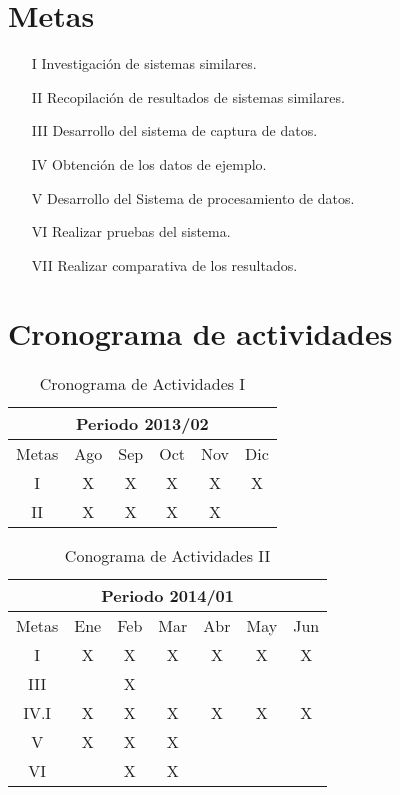 \section*{Metas}
\begin{itemize}
  \item[I] Investigación de sistemas similares.
  \item[II] Recopilación de resultados de sistemas similares.
  \item[III] Desarrollo del sistema  de captura de datos.
  \item[IV] Obtención de los datos de ejemplo.
  \item[V] Desarrollo del Sistema de procesamiento de datos.
  \item[VI] Realizar pruebas del sistema.
  \item[VII] Realizar comparativa de los resultados.
\end{itemize}





\section{Cronograma de actividades}



\begin{table}[h]
\centering
%

\begin{tabular}{|c|c|c|c|c|c|}
\hline
\multicolumn{6}{|c|}{Periodo 2013/02}\tabularnewline
\hline
\hline
Metas & Ago & Sep & Oct & Nov & Dic\tabularnewline
\hline
I & X & X & X & X & X\tabularnewline
\hline
II & X & X & X & X & \tabularnewline
\hline


\end{tabular}

\caption{Cronograma de Actividades I}
\label{reglasI}
\end{table}%



\begin{table}[h]
\centering
%

\begin{tabular}{|c|c|c|c|c|c|c|}
\hline
\multicolumn{7}{|c|}{Periodo 2014/01}\tabularnewline
\hline
\hline
Metas & Ene & Feb & Mar & Abr & May & Jun\tabularnewline
\hline
I & X & X & X & X & X & X\tabularnewline
\hline
III &  & X &  &  &  & \tabularnewline
\hline
IV.I & X & X & X & X & X & X\tabularnewline
\hline
V & X & X & X &  &  & \tabularnewline
\hline
VI &  & X & X &  &  & \tabularnewline
\hline


\end{tabular}
%

\caption{Conograma de Actividades II}
\label{reglasII}
\end{table}%



